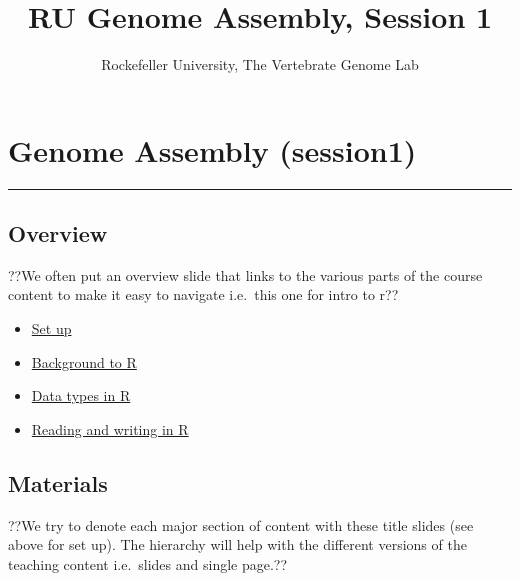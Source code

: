 \documentclass[
]{article}
\title{RU Genome Assembly, Session 1}
\author{Rockefeller University, The Vertebrate Genome Lab}
\date{}
\providecommand{\tightlist}{%
  \setlength{\itemsep}{0pt}\setlength{\parskip}{0pt}}
\begin{document}
\maketitle

{
\setcounter{tocdepth}{2}
\tableofcontents
}
\hypertarget{genome-assembly-session1}{%
\section{Genome Assembly (session1)}\label{genome-assembly-session1}}

\begin{center}\rule{0.5\linewidth}{0.5pt}\end{center}

\hypertarget{overview}{%
\subsection{Overview}\label{overview}}

??We often put an overview slide that links to the various parts of the
course content to make it easy to navigate i.e.~this one for intro to
r??

\begin{itemize}
\tightlist
\item
  \href{https://rockefelleruniversity.github.io/Intro_To_R_1Day/r_course/presentations/singlepage/introToR_Session1.html\#set-up}{Set
  up}
\item
  \href{https://rockefelleruniversity.github.io/Intro_To_R_1Day/r_course/presentations/singlepage/introToR_Session1.html\#background-to-r}{Background
  to R}
\item
  \href{https://rockefelleruniversity.github.io/Intro_To_R_1Day/r_course/presentations/singlepage/introToR_Session1.html\#data_types_in_r}{Data
  types in R}
\item
  \href{https://rockefelleruniversity.github.io/Intro_To_R_1Day/r_course/presentations/singlepage/introToR_Session1.html\#reading-and-writing-data-in-r}{Reading
  and writing in R}
\end{itemize}

\hypertarget{materials}{%
\subsection{Materials}\label{materials}}

??We try to denote each major section of content with these title slides
(see above for set up). The hierarchy will help with the different
versions of the teaching content i.e.~slides and single page.??
\end{document}
